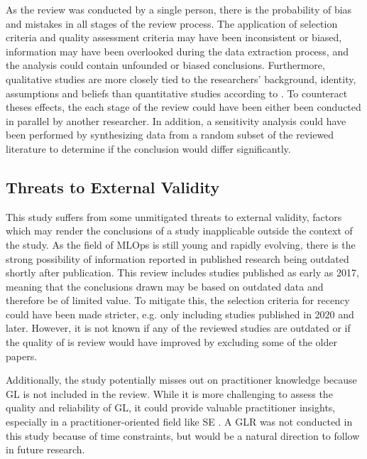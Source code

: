 As the review was conducted by a single person, there is the probability of bias and mistakes in all stages of the review process.
The application of selection criteria and quality assessment criteria may have been inconsistent or biased, information may have been overlooked during the data extraction process, and the analysis could contain unfounded or biased conclusions.
Furthermore, qualitative studies are more closely tied to the researchers' background, identity, assumptions and beliefs than quantitative studies according to \textcite{Oates2005}.
To counteract theses effects, the each stage of the review could have been either been conducted in parallel by another researcher.
In addition, a sensitivity analysis could have been performed by synthesizing data from a random subset of the reviewed literature to determine if the conclusion would differ significantly.

\subsection{Threats to External Validity}
This study suffers from some unmitigated threats to external validity, factors which may render the conclusions of a study inapplicable outside the context of the study.
As the field of MLOps is still young and rapidly evolving, there is the strong possibility of information reported in published research being outdated shortly after publication.
This review includes studies published as early as 2017, meaning that the conclusions drawn may be based on outdated data and therefore be of limited value.
To mitigate this, the selection criteria for recency could have been made stricter, e.g. only including studies published in 2020 and later.
However, it is not known if any of the reviewed studies are outdated or if the quality of is review would have improved by excluding some of the older papers.

Additionally, the study potentially misses out on practitioner knowledge because GL is not included in the review.
While it is more challenging to assess the quality and reliability of GL, it could provide valuable practitioner insights, especially in a practitioner-oriented field like SE \cite{Garousi2016}.
A GLR was not conducted in this study because of time constraints, but would be a natural direction to follow in future research.

